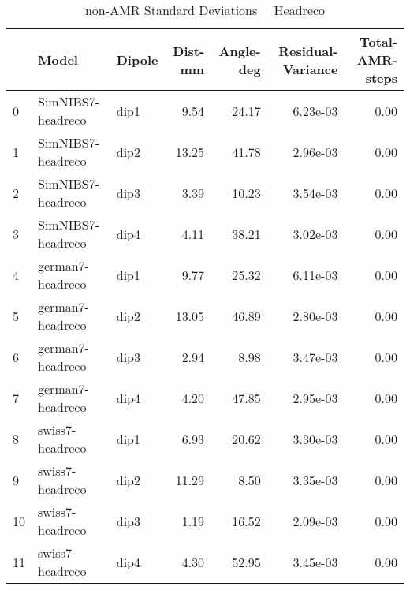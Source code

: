 \documentclass{article}
\begin{document}
\begin{table}
\begin{tabular}{lllrrrr}
\toprule
& Model& Dipole& Dist-mm& Angle-deg& Residual-Variance& Total-AMR-steps\\
\midrule
\rowcolor{lightgray}0 & SimNIBS7-headreco & dip1 & 9.54 & 24.17 & 6.23e-03 & 0.00\\
\rowcolor{lightgray}1 & SimNIBS7-headreco & dip2 & 13.25 & 41.78 & 2.96e-03 & 0.00\\
\rowcolor{lightgray}2 & SimNIBS7-headreco & dip3 & 3.39 & 10.23 & 3.54e-03 & 0.00\\
\rowcolor{lightgray}3 & SimNIBS7-headreco & dip4 & 4.11 & 38.21 & 3.02e-03 & 0.00\\
\rowcolor{yellow}4 & german7-headreco & dip1 & 9.77 & 25.32 & 6.11e-03 & 0.00\\
\rowcolor{yellow}5 & german7-headreco & dip2 & 13.05 & 46.89 & 2.80e-03 & 0.00\\
\rowcolor{yellow}6 & german7-headreco & dip3 & 2.94 & 8.98 & 3.47e-03 & 0.00\\
\rowcolor{yellow}7 & german7-headreco & dip4 & 4.20 & 47.85 & 2.95e-03 & 0.00\\
\rowcolor{pink}8 & swiss7-headreco & dip1 & 6.93 & 20.62 & 3.30e-03 & 0.00\\
\rowcolor{pink}9 & swiss7-headreco & dip2 & 11.29 & 8.50 & 3.35e-03 & 0.00\\
\rowcolor{pink}10 & swiss7-headreco & dip3 & 1.19 & 16.52 & 2.09e-03 & 0.00\\
\rowcolor{pink}11 & swiss7-headreco & dip4 & 4.30 & 52.95 & 3.45e-03 & 0.00\\
\end{tabular}
\caption{non-AMR Standard Deviations \ \textemdash \ Headreco}
\end{table}
\end{document}
